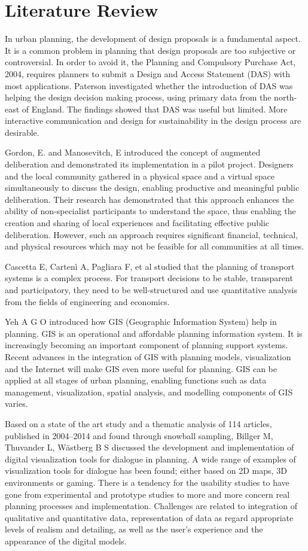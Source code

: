 \section*{Literature Review}
In urban planning, the development of design proposals is a fundamental aspect. It is a common problem in planning that design proposals are too subjective or controversial. In order to avoid it, the Planning and Compulsory Purchase Act, 2004, requires planners to submit a Design and Access Statement (DAS) with most applications. Paterson investigated whether the introduction of DAS was helping the design decision making process, using primary data from the north-east of England. The findings showed that DAS was useful but limited. More interactive communication and design for sustainability in the design process are desirable.

Gordon, E. and Manosevitch, E introduced the concept of augmented deliberation and demonstrated its implementation in a pilot project. Designers and the local community gathered in a physical space and a virtual space simultaneously to discuss the design, enabling productive and meaningful public deliberation. Their research has demonstrated that this approach enhances the ability of non-specialist participants to understand the space, thus enabling the creation and sharing of local experiences and facilitating effective public deliberation. However, such an approach requires significant financial, technical, and physical resources which may not be feasible for all communities at all times.

Cascetta E, Cartenì A, Pagliara F, et al studied that the planning of transport systems is a complex process. For transport decisions to be stable, transparent and participatory, they need to be well-structured and use quantitative analysis from the fields of engineering and economics.

Yeh A G O introduced how GIS (Geographic Information System) help in planning. GIS is an operational and affordable planning information system. It is increasingly becoming an important component of planning support systems. Recent advances in the integration of GIS with planning models, visualization and the Internet will make GIS even more useful for planning. GIS can be applied at all stages of urban planning, enabling functions such as data management, visualization, spatial analysis, and modelling components of GIS varies.

Based on a state of the art study and a thematic analysis of 114 articles, published in 2004–2014 and found through snowball sampling, Billger M, Thuvander L, Wästberg B S discussed the development and implementation of digital visualization tools for dialogue in planning. A wide range of examples of visualization tools for dialogue has been found; either based on 2D maps, 3D environments or gaming. There is a tendency for the usability studies to have gone from experimental and prototype studies to more and more concern real planning processes and implementation. Challenges are related to integration of qualitative and quantitative data, representation of data as regard appropriate levels of realism and detailing, as well as the user’s experience and the appearance of the digital models.

